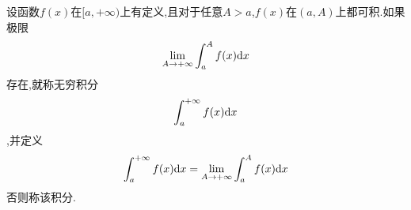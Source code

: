 \documentclass{ctexart}
\begin{document}
\pagestyle{empty}
\begin{center}\large{}\end{center}
\begin{definition}[1.1 无穷积分]
    设函数$f(x)$在$[a,+\infty)$上有定义,且对于任意$A>a$,$f(x)$在$(a,A)$上都可积.如果极限
    \[\lim_{A\to+\infty}\int_a^Af(x)\mathrm{d} x\]
    存在,就称无穷积分
    \[\int_a^{+\infty}f(x)\mathrm{d} x\]
    ,并定义
    \[\int_a^{+\infty}f(x)\mathrm{d} x=\lim_{A\to+\infty}\int_a^Af(x)\mathrm{d} x\]
    否则称该积分.
\end{definition}
\end{document}
